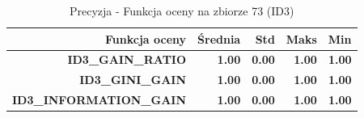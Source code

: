 \begin{table}[htbp]
\centering
\small
\setlength{\tabcolsep}{6pt}
\renewcommand{\arraystretch}{1.2}
\caption{Precyzja - Funkcja oceny na zbiorze 73 (ID3)}
\label{tab:ID3_eval_function_73_precision}
\begin{tabular}{r|r|r|r|r}
\toprule
Funkcja oceny & Średnia & Std & Maks & Min \\
\hline
\textbf{ID3\_GAIN\_RATIO} & \textbf{1.00} & \textbf{0.00} & \textbf{1.00} & \textbf{1.00} \\
\textbf{ID3\_GINI\_GAIN} & \textbf{1.00} & \textbf{0.00} & \textbf{1.00} & \textbf{1.00} \\
\textbf{ID3\_INFORMATION\_GAIN} & \textbf{1.00} & \textbf{0.00} & \textbf{1.00} & \textbf{1.00} \\
\bottomrule
\end{tabular}
\end{table}